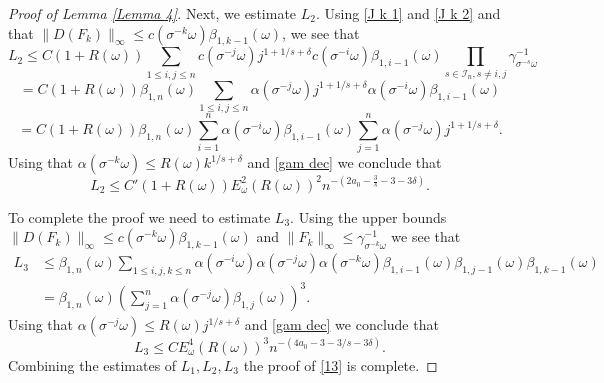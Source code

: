 \documentclass[10pt,a4paper]{amsart}
\def\om{\omega}
\begin{document}
\begin{proof}[Proof of Lemma \ref{Lemma 4}]
Next, we estimate $L_2$. Using \eqref{J k 1} and \eqref{J k 2} and that $\|D(F_k)\|_\infty\leq c(\sigma^{-k}\om)\beta_{1,k-1}(\om)$, 
we see that 
$$
L_2\leq C(1+R(\om))\sum_{1\leq i,j\leq n}c(\sigma^{-j}\om)j^{1+1/s+\delta}c(\sigma^{-i}\om)\beta_{1,i-1} (\om)\prod_{s\in \mathcal I_n, s\not=i,j}\gamma_{\sigma^{-s}\om}^{-1}
$$
$$
=C(1+R(\om))\beta_{1,n}(\om)\sum_{1\leq i,j\leq n}\alpha(\sigma^{-j}\om)j^{1+1/s+\delta}\alpha(\sigma^{-i}\om)\beta_{1,i-1}(\om)
$$
$$
=C(1+R(\om))\beta_{1,n}(\om)\sum_{i=1}^n\alpha(\sigma^{-i}\om)\beta_{1,i-1}(\om)\sum_{j=1}^n \alpha(\sigma^{-j}\om)j^{1+1/s+\delta}.
$$
Using that $\alpha(\sigma^{-k}\om)\leq R(\om)k^{1/s+\delta}$ and \eqref{gam dec} we conclude that 
$$
L_2\leq C'(1+R(\om))E_\om^2 (R(\om))^2 n^{-(2a_0-\frac 3 s -3-3\delta)}.
$$

To complete the proof we need to estimate $L_3$. Using the upper bounds $\|D(F_k)\|_\infty\leq c(\sigma^{-k}\om)\beta_{1,k-1}(\om)$ and $\|F_k\|_\infty\leq \gamma_{\sigma^{-k}\om}^{-1}$ we see that 
\[
\begin{split}
L_3 &\leq \beta_{1,n}(\om)\sum_{1\leq i,j,k\leq n}\alpha(\sigma^{-i}\om)\alpha(\sigma^{-j}\om)\alpha(\sigma^{-k}\om)\beta_{1,i-1}(\om)\beta_{1,j-1}(\om)\beta_{1,k-1}(\om) \\
&=\beta_{1,n}(\om)\left(\sum_{j=1}^n \alpha(\sigma^{-j}\om)\beta_{1,j}(\om)\right)^3.
\end{split}
\]
Using that $\alpha(\sigma^{-j}\om)\leq R(\om)j^{1/s+\delta}$ and \eqref{gam dec} we conclude that 
$$
L_3\leq CE_\om^4(R(\om))^3 n^{-(4a_0-3-3/s-3\delta)}.
$$
Combining the estimates of $L_1,L_2,L_3$ the proof of \eqref{13} is complete.
\end{proof}
\end{document}
